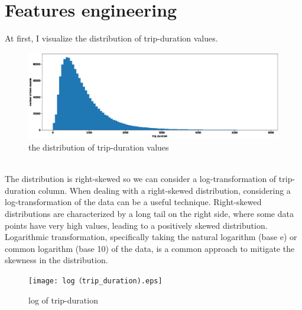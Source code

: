 \section{Features engineering} \label{sec-Features engineering}


At first, I visualize the distribution of trip-duration values.
\begin{figure}[h]
	\centering
	\includegraphics[scale=0.3]{trip_duration.eps}
	\caption{the distribution of trip-duration values}
\end{figure}
\\
The distribution is right-skewed so we can consider a log-transformation of trip-duration column.
When dealing with a right-skewed distribution, considering a log-transformation of the data can be a useful technique. Right-skewed distributions are characterized by a long tail on the right side, where some data points have very high values, leading to a positively skewed distribution.
\\
Logarithmic transformation, specifically taking the natural logarithm (base e) or common logarithm (base 10) of the data, is a common approach to mitigate the skewness in the distribution. 
\begin{figure}[h]
	\centering
	\texttt{[image: log（trip\_duration).eps]}
	\caption{log of trip-duration}
\end{figure}
